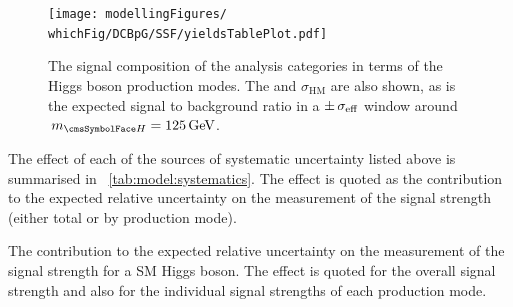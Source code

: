 \begin{figure}
 \begin{center}
 \texttt{[image: modellingFigures/\\whichFig/DCBpG/SSF/yieldsTablePlot.pdf]}
 \caption{The signal composition of the analysis categories in terms of the Higgs boson production modes. The \effSigma and $\sigma_{\text{HM}}$ are also shown, as is the expected signal to background ratio in a $\pm \,\sigma_{\text{eff}}$ window around $\mH=125\GeV$.} 
 \label{fig:model:sig_table_visualisation}
 \end{center}
\end{figure}

The effect of each of the sources of systematic uncertainty listed above is summarised in \Table~\ref{tab:model:systematics}. The effect is quoted as the contribution to the expected relative uncertainty on the measurement of the signal strength (either total or by production mode). 

 \begin{table}[b]
 \resizebox{\textwidth}{!}{

}
 \caption{ The contribution to the expected relative uncertainty on the measurement of the signal strength for a SM Higgs boson. The effect is quoted for the overall signal strength and also for the individual signal strengths of each production mode.}
 \label{tab:model:systematics}
\end{table}
